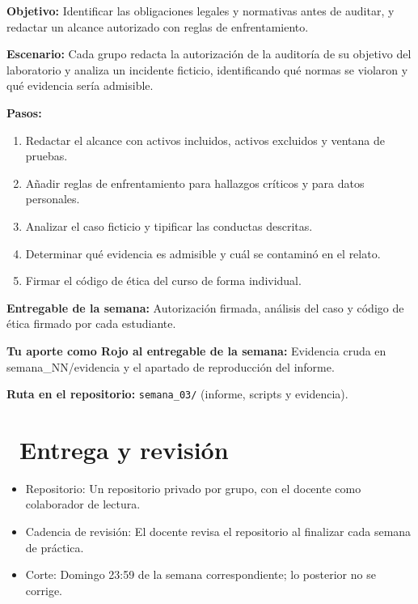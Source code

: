 \documentclass[11pt,a4paper]{article}
\newcommand{\iconotexto}[2]{\textcolor{cyanNeon}{\faIcon{#1}}~#2}
\begin{document}
\begin{tcolorbox}[cajaContenido,title={Semana 3 --- Carta de autorización y análisis de caso}]
\textbf{Objetivo:} Identificar las obligaciones legales y normativas antes de auditar, y redactar un alcance autorizado con reglas de enfrentamiento.

\textbf{Escenario:} Cada grupo redacta la autorización de la auditoría de su objetivo del laboratorio y analiza un incidente ficticio, identificando qué normas se violaron y qué evidencia sería admisible.


\textbf{Pasos:}
\begin{enumerate}[leftmargin=1.4em,itemsep=2pt,topsep=3pt]
  \item Redactar el alcance con activos incluidos, activos excluidos y ventana de pruebas.
  \item Añadir reglas de enfrentamiento para hallazgos críticos y para datos personales.
  \item Analizar el caso ficticio y tipificar las conductas descritas.
  \item Determinar qué evidencia es admisible y cuál se contaminó en el relato.
  \item Firmar el código de ética del curso de forma individual.
\end{enumerate}
\textbf{Entregable de la semana:} Autorización firmada, análisis del caso y código de ética firmado por cada estudiante.

\textbf{Tu aporte como Rojo al entregable de la semana:} Evidencia cruda en semana\_NN/evidencia y el apartado de reproducción del informe.

\textbf{Ruta en el repositorio:} \texttt{semana\_03/} (informe, scripts y evidencia).
\end{tcolorbox}

\section{\iconotexto{code-branch}{Entrega y revisión}}

\begin{itemize}[leftmargin=1.4em,itemsep=2pt,topsep=3pt]
  \item Repositorio: Un repositorio privado por grupo, con el docente como colaborador de lectura.
  \item Cadencia de revisión: El docente revisa el repositorio al finalizar cada semana de práctica.
  \item Corte: Domingo 23:59 de la semana correspondiente; lo posterior no se corrige.
\end{itemize}
\end{document}
